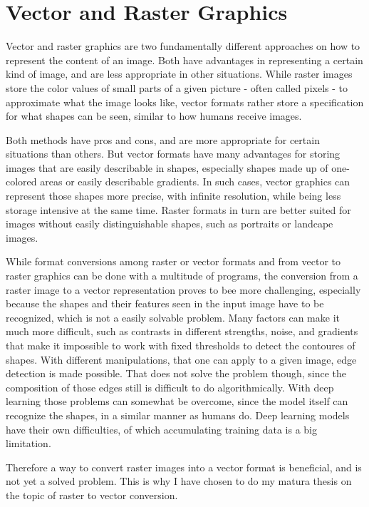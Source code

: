 \documentclass[12pt, a4paper, titlepage]{report}
\begin{document}
\section{Vector and Raster Graphics}

Vector and raster graphics are two fundamentally different approaches on how to represent the content of an image. Both have advantages in representing a certain kind of image, and are less appropriate in other situations. While raster images store the color values of small parts of a given picture - often called pixels - to approximate what the image looks like, vector formats rather store a specification for what shapes can be seen, similar to how humans receive images.

Both methods have pros and cons, and are more appropriate for certain situations than others. But vector formats have many advantages for storing images that are easily describable in shapes, especially shapes made up of one-colored areas or easily describable gradients. In such cases, vector graphics can represent those shapes more precise, with infinite resolution, while being less storage intensive at the same time. Raster formats in turn are better suited for images without easily distinguishable shapes, such as portraits or landcape images.

While format conversions among raster or vector formats and from vector to raster graphics can be done with a multitude of programs, the conversion from a raster image to a vector representation proves to bee more challenging, especially because the shapes and their features seen in the input image have to be recognized, which is not a easily solvable problem. Many factors can make it much more difficult, such as contrasts in different strengths, noise, and gradients that make it impossible to work with fixed thresholds to detect the contoures of shapes. With different manipulations, that one can apply to a given image, edge detection is made possible. That does not solve the problem though, since the composition of those edges still is difficult to do algorithmically.
With deep learning those problems can somewhat be overcome, since the model itself can recognize the shapes, in a similar manner as humans do. Deep learning models have their own difficulties, of which accumulating training data is a big limitation.

Therefore a way to convert raster images into a vector format is beneficial, and is not yet a solved problem. This is why I have chosen to do my matura thesis on the topic of raster to vector conversion.
\end{document}
